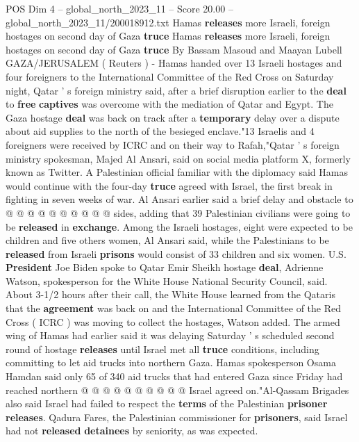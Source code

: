 \begin{textsample}{POS Dim 4 – global\_north\_2023\_11 – Score 20.00 – global\_north\_2023\_11/200018912.txt}  \label{ex:f4_pos_275}
Hamas \textbf{releases} more Israeli, foreign hostages on second day of Gaza \textbf{truce} Hamas \textbf{releases} more Israeli, foreign hostages on second day of Gaza \textbf{truce} By Bassam Masoud and Maayan Lubell GAZA/JERUSALEM ( Reuters ) - Hamas handed over 13 Israeli hostages and four foreigners to the International Committee of the Red Cross on Saturday night, Qatar ' s foreign ministry said, after a brief disruption earlier to the \textbf{deal} to \textbf{free} \textbf{captives} was overcome with the mediation of Qatar and Egypt.
The Gaza hostage \textbf{deal} was back on track after a \textbf{temporary} delay over a dispute about aid supplies to the north of the besieged enclave."13 Israelis and 4 foreigners were received by ICRC and on their way to Rafah,"Qatar ' s foreign ministry spokesman, Majed Al Ansari, said on social media platform X, formerly known as Twitter.
A Palestinian official familiar with the diplomacy said Hamas would continue with the four-day \textbf{truce} agreed with Israel, the first break in fighting in seven weeks of war.
Al Ansari earlier said a brief delay and obstacle to @ @ @ @ @ @ @ @ @ @ sides, adding that 39 Palestinian civilians were going to be \textbf{released} in \textbf{exchange}.
Among the Israeli hostages, eight were expected to be children and five others women, Al Ansari said, while the Palestinians to be \textbf{released} from Israeli \textbf{prisons} would consist of 33 children and six women.
U.S. \textbf{President} Joe Biden spoke to Qatar Emir Sheikh hostage \textbf{deal}, Adrienne Watson, spokesperson for the White House National Security Council, said.
About 3-1/2 hours after their call, the White House learned from the Qataris that the \textbf{agreement} was back on and the International Committee of the Red Cross ( ICRC ) was moving to collect the hostages, Watson added.
The armed wing of Hamas had earlier said it was delaying Saturday ' s scheduled second round of hostage \textbf{releases} until Israel met all \textbf{truce} conditions, including committing to let aid trucks into northern Gaza.
Hamas spokesperson Osama Hamdan said only 65 of 340 aid trucks that had entered Gaza since Friday had reached northern @ @ @ @ @ @ @ @ @ @ Israel agreed on."Al-Qassam Brigades also said Israel had failed to respect the \textbf{terms} of the Palestinian \textbf{prisoner} \textbf{releases}.
Qadura Fares, the Palestinian commissioner for \textbf{prisoners}, said Israel had not \textbf{released} \textbf{detainees} by seniority, as was expected.

\end{textsample}
